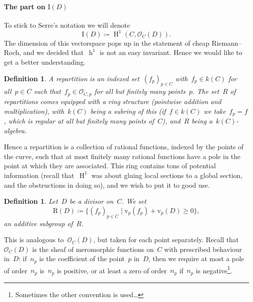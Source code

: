 \documentclass[10pt,a4paper]{article}
\theoremstyle{lecture}
\newtheorem{definition}[theorem]{Definition}
\newcommand\dash{\nobreakdash-\hspace{0pt}}
\DeclareMathOperator\hh{h}
\DeclareMathOperator\HH{H}
\begin{document}
\paragraph{The part on $\mathrm{I}(D)$}
To stick to Serre's notation we will denote
\begin{equation}
  \mathrm{I}(D)\coloneqq\HH^1(C,\mathcal{O}_C(D)).
\end{equation}
The dimension of this vectorspace pops up in the statement of cheap Riemann--Roch, and we decided that~$\hh^1$ is not an easy invariant. Hence we would like to get a better understanding.
\begin{definition}
  A \emph{repartition} is an indexed set~$(f_p)_{p\in C}$ with~$f_p\in k(C)$ for all~$p\in C$ such that~$f_p\in\mathcal{O}_{C,p}$ for all but finitely many points~$p$. The set~$R$ of repartitions comes equipped with a ring structure (pointwise addition and multiplication), with~$k(C)$ being a subring of this (if~$f\in k(C)$ we take~$f_p=f$, which is regular at all but finitely many points of~$C$), and~$R$ being a~$k(C)$\dash algebra.
\end{definition}
Hence a repartition is a collection of rational functions, indexed by the points of the curve, such that at most finitely many rational functions have a pole in the point at which they are associated. This ring contains tons of potential information (recall that~$\HH^1$ was about gluing local sections to a global section, and the obstructions in doing so), and we wish to put it to good use.
\begin{definition}
  Let~$D$ be a divisor on~$C$. We set
  \begin{equation}
    \mathrm{R}(D)\coloneqq\{(f_p)_{p\in C}\mid \mathrm{v}_p(f_p)+\mathrm{v}_p(D)\geq 0\},
  \end{equation}
  an additive subgroup of~$R$.
\end{definition}
This is analogous to~$\mathcal{O}_C(D)$, but taken for each point separately. Recall that~$\mathcal{O}_C(D)$ is the sheaf of meromorphic functions on~$C$ with prescribed behaviour in~$D$: if~$n_p$ is the coefficient of the point~$p$ in~$D$, then we require at most a pole of order~$n_p$ is~$n_p$ is positive, or at least a zero of order~$n_p$ if~$n_p$ is negative\footnote{Sometimes the other convention is used\dots}.
\end{document}
